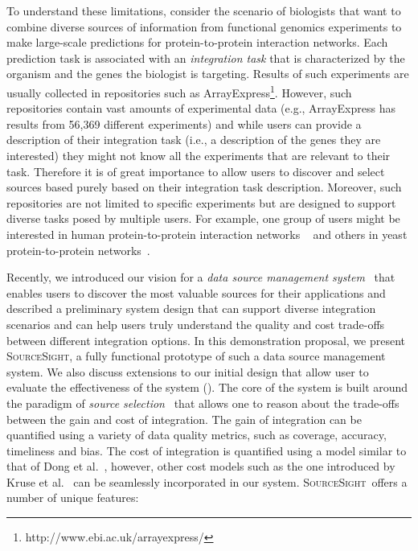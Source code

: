 \documentclass{vldb}
\newcommand\system{\textsc{SourceSight}}
\begin{document}
To understand these limitations, consider the scenario of biologists that want to combine diverse sources of information from functional genomics experiments to make large-scale predictions for protein-to-protein interaction networks. Each prediction task is associated with an {\em integration task} that is characterized by the organism and the genes the biologist is targeting. Results of such experiments are usually collected in repositories such as ArrayExpress\footnote{http://www.ebi.ac.uk/arrayexpress/}. However, such repositories contain vast amounts of experimental data (e.g., ArrayExpress has results from 56,369 different experiments) and while users can provide a description of their integration task (i.e., a description of the genes they are interested) they might not know all the experiments that are relevant to their task. Therefore it is of great importance to allow users to discover and select sources based purely based on their integration task description. Moreover, such repositories are not limited to specific experiments but are designed to support diverse tasks posed by multiple users. For example, one group of users might be interested in human protein-to-protein interaction networks ~\cite{humanpp} and others in yeast protein-to-protein networks~\cite{yeastpp}.

Recently, we introduced our vision for a {\em data source management system}~\cite{rekatsinas:2015} that enables users to discover the most valuable sources for their applications and described a preliminary system design that can support diverse integration scenarios and can help users truly understand the quality and cost trade-offs between different integration options. In this demonstration proposal, we present \system, a fully functional prototype of such a data source management system. We also discuss extensions to our initial design that allow user to evaluate the effectiveness of the system (). The core of the system is built around the paradigm of {\em source selection}~\cite{dong:vldb13} that allows one to reason about the trade-offs between the gain and cost of integration. The gain of integration can be quantified using a variety of data quality metrics, such as coverage, accuracy, timeliness and bias. The cost of integration is quantified using a model similar to that of Dong et al.~\cite{dong:vldb13}, however, other cost models such as the one introduced by Kruse et al.~\cite{kruse2015estimating} can be seamlessly incorporated in our system. \system~offers a number of unique features:
\end{document}
